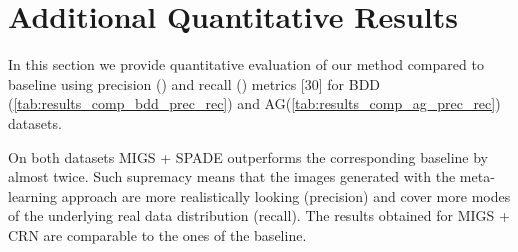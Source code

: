 \documentclass{bmvc2k}
\begin{document}
\section{Additional Quantitative Results}
In this section we provide quantitative evaluation of our method compared to baseline using precision () and recall () metrics [30] for BDD (\autoref{tab:results_comp_bdd_prec_rec}) and AG(\autoref{tab:results_comp_ag_prec_rec}) datasets.
\begin{table}[tbp]
    \centering
    \caption{Additional quantitative results on BDD100k fine-tuned on 5,10 and 160 shots.}
    \label{tab:results_comp_bdd_prec_rec}
\end{table}
On both datasets MIGS + SPADE outperforms the corresponding baseline by almost twice. Such supremacy means that the images generated with the meta-learning approach are more realistically looking (precision) and cover more modes of the underlying real data distribution (recall). The results obtained for MIGS + CRN are comparable to the ones of the baseline. 


\begin{table}[tbp]
    \centering
    \caption{Additional quantitative results on Action Genome dataset compared to related work. }
    \label{tab:results_comp_ag_prec_rec}
\end{table}
\end{document}
